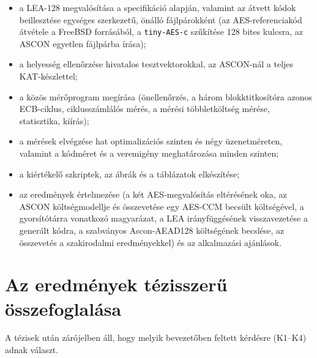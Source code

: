 \documentclass[a4paper,12pt]{report}
\theoremstyle{definition}
\theoremstyle{remark}
\begin{document}
\begin{itemize}
	\item a LEA-128 megvalósítása a specifikáció alapján, valamint az átvett kódok beillesztése egységes szerkezetű, önálló fájlpárokként (az AES-referenciakód átvétele a FreeBSD forrásából, a \texttt{tiny-AES-c} szűkítése 128 bites kulcsra, az ASCON egyetlen fájlpárba írása);
	\item a helyesség ellenőrzése hivatalos tesztvektorokkal, az ASCON-nál a teljes KAT-készlettel;
	\item a közös mérőprogram megírása (önellenőrzés, a három blokktitkosítóra azonos ECB-ciklus, ciklusszámlálós mérés, a mérési többletköltség mérése, statisztika, kiírás);
	\item a mérések elvégzése hat optimalizációs szinten és négy üzenetméreten, valamint a kódméret és a veremigény meghatározása minden szinten;
	\item a kiértékelő szkriptek, az ábrák és a táblázatok elkészítése;
	\item az eredmények értelmezése (a két AES-megvalósítás eltérésének oka, az ASCON költségmodellje és összevetése egy AES-CCM becsült költségével, a gyorsítótárra vonatkozó magyarázat, a LEA irányfüggésének visszavezetése a generált kódra, a szabványos Ascon-AEAD128 költségének becslése, az összevetés a szakirodalmi eredményekkel) és az alkalmazási ajánlások.
\end{itemize}

\section{Az eredmények tézisszerű összefoglalása}\label{sec:tezisek}

A tézisek után zárójelben áll, hogy melyik bevezetőben feltett kérdésre (K1--K4) adnak választ.
\end{document}
